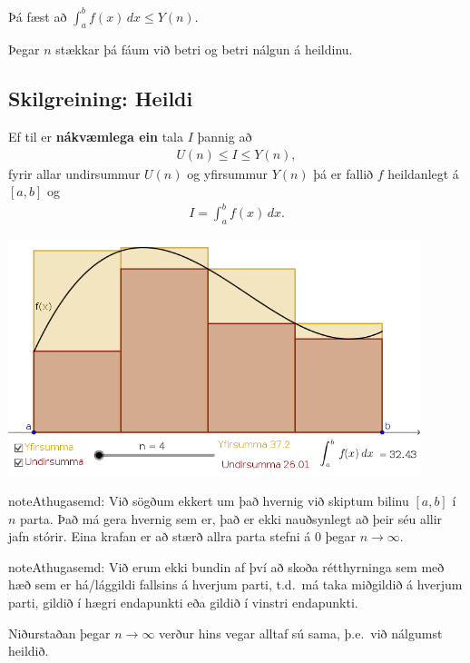 \documentclass[a4paper,10pt,icelandic]{sphinxmanual}
\begin{document}
Þá fæst að \(\int_a^b f(x)\, dx \leq Y(n)\).

Þegar \(n\) stækkar þá fáum við betri og betri nálgun á heildinu.


\subsection{Skilgreining: Heildi}
\label{kafli06:skilgreining-heildi}
Ef til er \textbf{nákvæmlega ein} tala \(I\) þannig að
\begin{equation*}
\begin{split}U(n) \leq I \leq Y(n),\end{split}
\end{equation*}
fyrir allar undirsummur \(U(n)\) og yfirsummur \(Y(n)\) þá er
fallið \(f\) heildanlegt á \([a,b]\) og
\begin{equation*}
\begin{split}I = \int_a^b f(x)\, dx.\end{split}
\end{equation*}

\begin{center}
\includegraphics[width=12cm,keepaspectratio=true]{./03_undirogyfirsumma.png}
\end{center}


\begin{notice}{note}{Athugasemd:}
Við sögðum ekkert um það hvernig við skiptum bilinu \([a,b]\) í
\(n\) parta. Það má gera hvernig sem er, það er ekki nauðsynlegt að
þeir séu allir jafn stórir. Eina krafan er að stærð allra parta stefni á
0 þegar \(n\to \infty\).
\end{notice}

\begin{notice}{note}{Athugasemd:}
Við erum ekki bundin af því að skoða rétthyrninga sem með hæð sem er
há/lággildi fallsins á hverjum parti, t.d. má taka miðgildið á hverjum
parti, gildið í hægri endapunkti eða gildið í vinstri endapunkti.

Niðurstaðan þegar \(n\to \infty\) verður hins vegar alltaf sú sama,
þ.e. við nálgumst heildið.
\end{notice}
\end{document}
